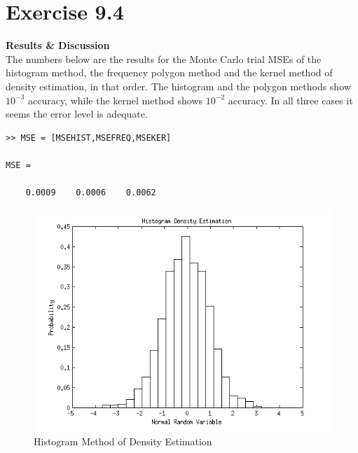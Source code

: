 \documentclass[12pt,a4paper]{article}
\begin{document}
\section*{Exercise 9.4}

\textbf{Results \& Discussion}\\
The numbers below are the results for the Monte Carlo trial MSEs of the histogram method, the frequency polygon method and the kernel method of density estimation, in that order. The histogram and the polygon methods show $10^{-3}$ accuracy, while the kernel method shows $10^{-2}$ accuracy. In all three cases it seems the error level is adequate.

\begin{verbatim}
>> MSE = [MSEHIST,MSEFREQ,MSEKER]

MSE =

    0.0009    0.0006    0.0062
\end{verbatim}

\begin{figure}[ht!] 
\begin{center}
\includegraphics[scale=.86]{q9p4_graph1.png}
\caption{Histogram Method of Density Estimation}
\label{q4 fig1}
\end{center}
\end{figure}
\FloatBarrier
\end{document}
